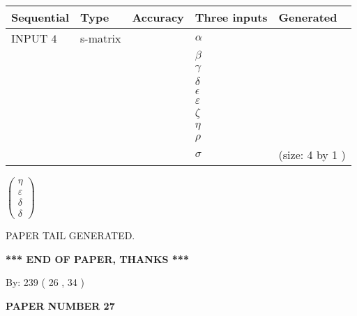 \documentclass[12pt]{article}
\begin{document}
  
\noindent\begin{tabular}{|l|l|l|l|l|}
\hline
 Sequential & Type & Accuracy & Three inputs & Generated \\ 
\hline
 
 
  INPUT $            4 $ & s-matrix & & 
 $  \alpha $ & 
  \\
  & & & 
 $  \beta $ & 
  \\
  & & & 
 $  \gamma $ & 
  \\
  & & & 
 $  \delta $ & 
  \\
  & & & 
 $  \epsilon $ & 
  \\
  & & & 
 $  \varepsilon $ & 
  \\
  & & & 
 $                     \zeta $ & 
  \\
  & & & 
 $  \eta $ & 
  \\
  & & & 
 $  \rho $ & 
  \\
  & & & 
 $  \sigma $ & 
  (size:            4  by            1 )
 \\  \hline  
 \end{tabular}
   
   
 $  \left( \begin{array}
 {
 c
 }
 \eta \\ 
 \varepsilon \\ 
 \delta \\ 
 \delta
 \end{array} \right) $ 
   
   
   
   
 \vspace{0.2in}
 
   
   
\vspace{2.0in} PAPER TAIL GENERATED.
   
   
   
   
\vspace{1.0in} 
{\textbf{\large{ *** END OF PAPER, THANKS *** }}} 
   
   
\hspace{1.0in} By: 
         239 (          26 ,           34 )
   
   
   
   
\newpage 
\setcounter{page}{ 
    27001 } 
   
   
   
   
 {\textbf{ \Large{ PAPER NUMBER           27  }}}
   
   
\vspace{0.2in}
   
\end{document}
